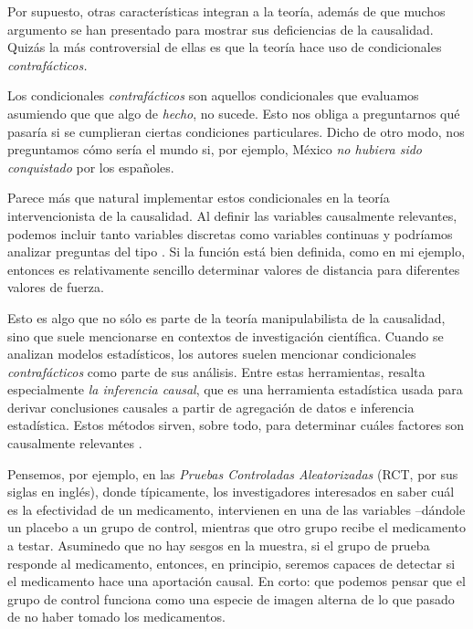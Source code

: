 Por supuesto, otras características integran a la teoría, además de que
muchos argumento se han presentado para mostrar sus deficiencias
de la causalidad. Quizás la más controversial de ellas es que la teoría
hace uso de condicionales \emph{contrafácticos. }

Los condicionales \emph{contrafácticos} son aquellos condicionales
que evaluamos asumiendo que que algo de \emph{hecho}, no sucede. Esto
nos obliga a preguntarnos qué pasaría si se cumplieran ciertas
condiciones particulares. Dicho de otro modo, nos preguntamos cómo
sería el mundo si, por ejemplo, México \emph{no hubiera sido
	conquistado} por los españoles.

Parece más que natural implementar estos condicionales en la teoría
intervencionista de la causalidad. Al definir las variables
causalmente relevantes, podemos incluir tanto variables discretas
como variables continuas y podríamos analizar preguntas del tipo
. Si la función está bien definida, como en
mi ejemplo, entonces es relativamente sencillo determinar valores de
distancia para diferentes valores de fuerza.

Esto es algo que no sólo es parte de la teoría manipulabilista de la
causalidad, sino que suele mencionarse en contextos de investigación
científica. Cuando se analizan modelos estadísticos, los autores
suelen mencionar condicionales \emph{contrafácticos} como parte de
sus análisis. Entre estas herramientas, resalta especialmente
\emph{la inferencia causal}, que es una herramienta estadística usada
para derivar conclusiones causales a partir de agregación de datos e
inferencia estadística. Estos métodos sirven, sobre todo, para
determinar cuáles factores son causalmente relevantes \parencite{Pearl2016, Pearl2018}.

Pensemos, por ejemplo, en las \emph{Pruebas Controladas
	Aleatorizadas} (RCT, por sus siglas en inglés), donde típicamente,
los investigadores interesados en saber cuál es la efectividad de un
medicamento, intervienen en una de las variables --dándole un placebo
a un grupo de control, mientras que otro grupo recibe el medicamento
a testar. Asuminedo que no hay sesgos en la muestra, si el grupo de
prueba responde al medicamento, entonces, en principio, seremos
capaces de detectar si el medicamento hace una aportación causal. En
corto: que podemos pensar que el grupo de control funciona como una
especie de imagen alterna de lo que  pasado de no haber
tomado los medicamentos.

